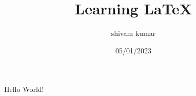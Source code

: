 \documentclass{article}
\title{Learning LaTeX}
\author{shivam kumar}
\date{05/01/2023}
\begin{document}
\maketitle

Hello World!
\end{document}
